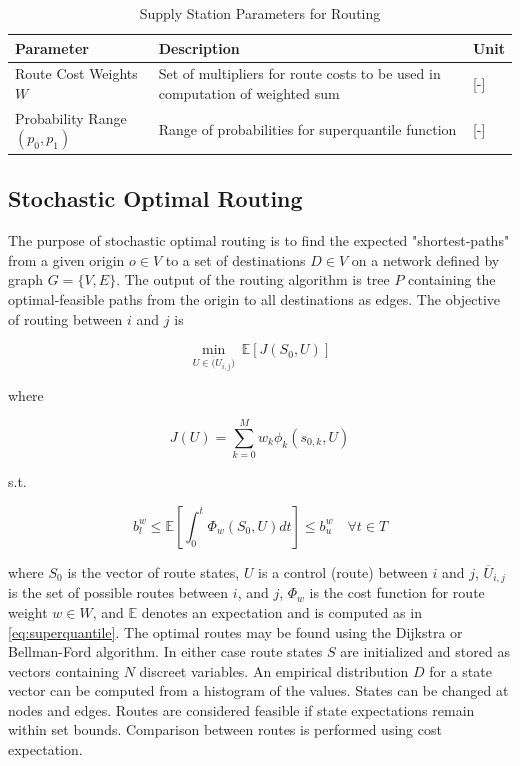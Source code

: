 \documentclass[11pt]{article}
\begin{document}
\begin{multicols}{2}
\begin{table}[H]
	\centering
	\caption{Supply Station Parameters for Routing}
	\label{tab:param_driver}
	\begin{tabular}{|C{/8}|C{/8}|C{/8}|}
		\hline Parameter & Description & Unit \\
		\hline Route Cost Weights $W$ & Set of multipliers for route costs to be used in computation of weighted sum & [-] \\
		\hline Probability Range $(p_0, p_1)$ & Range of probabilities for superquantile function & [-] \\
		\hline
	\end{tabular}
\end{table}

\subsection*{Stochastic Optimal Routing}

The purpose of stochastic optimal routing is to find the expected "shortest-paths" from a given origin $o \in V$ to a set of destinations $D \in V$ on a network defined by graph $G = \{V, E\}$. The output of the routing algorithm is tree $P$ containing the optimal-feasible paths from the origin to all destinations as edges. The objective of routing between $i$ and $j$ is

\begin{equation}
	\min_{U \in \overline({U}_{i,j})}\ \mathbb{E}[J(S_0, U)]
\end{equation}

where

\begin{equation}
	J(U) = \sum_{k = 0}^M w_k\phi_k(s_{0,k}, U)
\end{equation}

s.t.

\begin{equation}	
	b^w_l \leq \mathbb{E}\left[\int_0^t \Phi_w(S_0, U)dt\right] \leq b^w_u\quad \forall t \in T
\end{equation}

\noindent where $S_0$ is the vector of route states, $U$ is a control (route) between $i$ and $j$, $\overline{U}_{i,j}$ is the set of possible routes between $i$, and $j$, $\Phi_w$ is the cost function for route weight $w \in W$, and $\mathbb{E}$ denotes an expectation and is computed as in \eqref{eq:superquantile}. The optimal routes may be found using the Dijkstra or Bellman-Ford algorithm. In either case route states $S$ are initialized and stored as vectors containing $N$ discreet variables. An empirical distribution $D$ for a state vector can be computed from a histogram of the values. States can be changed at nodes and edges. Routes are considered feasible if state expectations remain within set bounds. Comparison between routes is performed using cost expectation.


\end{multicols}
\end{document}
